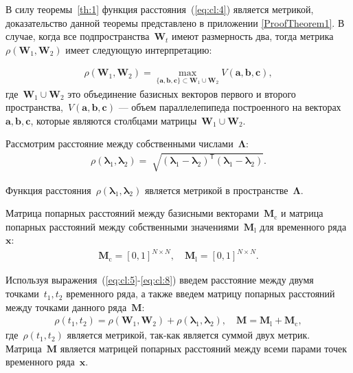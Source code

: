 \documentclass[12pt, twoside]{article}
\numberwithin{equation}{section}
\begin{document}
В силу теоремы~\ref{th:1} функция расстояния~(\ref{eq:cl:4}) является метрикой, доказательство данной теоремы представлено в приложении \ref{ProofTheorem1}. В случае, когда все подпространства~$\textbf{W}_t$ имеют размерность два, тогда метрика~$\rho\left(\textbf{W}_1, \textbf{W}_2\right)$ имеет следующую интерпретацию:

\begin{equation}
\label{eq:cl:5}
\begin{aligned}
\rho\left(\textbf{W}_1, \textbf{W}_2\right) = \max_{\{\textbf{a},\textbf{b},\textbf{c}\} \subset \textbf{W}_1\cup \textbf{W}_2 } V\left(\textbf{a},\textbf{b},\textbf{c}\right), 
\end{aligned}
\end{equation}
где~$\textbf{W}_1\cup\textbf{W}_2$ это объединение базисных векторов первого и второго пространства,~$V\left(\textbf{a},\textbf{b},\textbf{c}\right)$ --- объем параллелепипеда построенного на векторах~$\textbf{a}, \textbf{b}, \textbf{c}$, которые являются столбцами матрицы~$\textbf{W}_1\cup\textbf{W}_2$.


Рассмотрим расстояние между собственными числами~$\bm{\Lambda}$:
\begin{equation}
\label{eq:cl:6}
\begin{aligned}
\rho\left(\bm{\lambda}_1, \bm{\lambda}_2\right) = \sqrt[]{\left(\bm{\lambda}_1 - \bm{\lambda}_2\right)^{\mathsf{T}}\left(\bm{\lambda}_1 - \bm{\lambda}_2\right)}.
\end{aligned}
\end{equation}

Функция расстояния~$\rho\left(\bm{\lambda}_1, \bm{\lambda}_2\right)$ является метрикой в пространстве~$\bm{\Lambda}$.

Матрица попарных расстояний между базисными векторами~$\textbf{M}_{\text{c}}$ и матрица попарных расстояний между собственными значениями~$\textbf{M}_{\text{l}}$ для временного ряда~$\textbf{x}$:
\begin{equation}
\label{eq:cl:8}
\begin{aligned}
\textbf{M}_{\text{c}} = [0, 1]^{N\times N}, \quad \textbf{M}_{\text{l}} = [0, 1]^{N\times N}.
\end{aligned}
\end{equation}

Используя выражения~(\ref{eq:cl:5}-\ref{eq:cl:8}) введем расстояние между двумя точками~$t_1, t_2$ временного ряда, а также введем матрицу попарных расстояний между точками данного ряда~$\textbf{M}$:
\begin{equation}
\label{eq:cl:9}
\begin{aligned}
\rho\left(t_1, t_2\right) = \rho\left(\textbf{W}_1, \textbf{W}_2\right) + \rho\left(\bm{\lambda}_1, \bm{\lambda}_2\right), \quad \textbf{M} = \textbf{M}_{\text{l}} + \textbf{M}_{\text{c}},
\end{aligned}
\end{equation}
где~$\rho\left(t_1, t_2\right)$ является метрикой, так-как является суммой двух метрик. Матрица~$\textbf{M}$ является матрицей попарных расстояний между всеми парами точек временного ряда~$\textbf{x}$.
\end{document}
